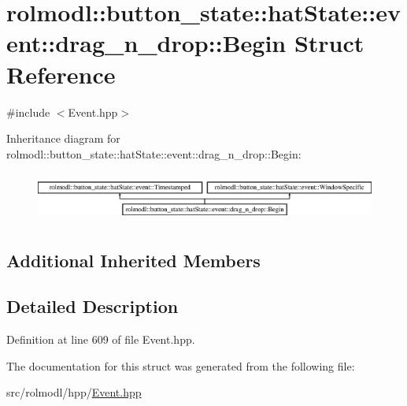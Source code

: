 \hypertarget{structrolmodl_1_1button__state_1_1hat_state_1_1event_1_1drag__n__drop_1_1_begin}{}\section{rolmodl\+::button\+\_\+state\+::hat\+State\+::event\+::drag\+\_\+n\+\_\+drop\+::Begin Struct Reference}
\label{structrolmodl_1_1button__state_1_1hat_state_1_1event_1_1drag__n__drop_1_1_begin}


{\ttfamily \#include $<$Event.\+hpp$>$}

Inheritance diagram for rolmodl\+::button\+\_\+state\+::hat\+State\+::event\+::drag\+\_\+n\+\_\+drop\+::Begin\+:\begin{figure}[H]
\begin{center}
\leavevmode
\includegraphics[height=1.651917cm]{structrolmodl_1_1button__state_1_1hat_state_1_1event_1_1drag__n__drop_1_1_begin}
\end{center}
\end{figure}
\subsection*{Additional Inherited Members}


\subsection{Detailed Description}


Definition at line 609 of file Event.\+hpp.



The documentation for this struct was generated from the following file\+:\begin{DoxyCompactItemize}
\item 
src/rolmodl/hpp/\mbox{\hyperlink{_event_8hpp}{Event.\+hpp}}\end{DoxyCompactItemize}
